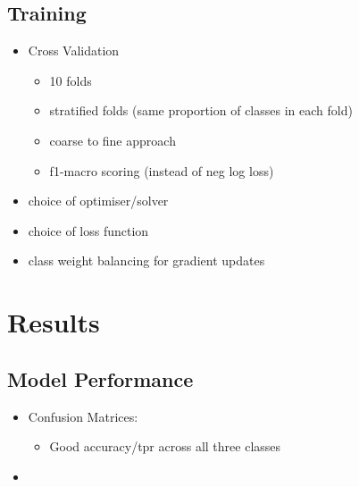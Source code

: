 \documentclass{article}
\begin{document}
\subsection{Training} \label{sec:training}
\begin{itemize}
    \item Cross Validation
          \begin{itemize}
              \item 10 folds
              \item stratified folds (same proportion of classes in each fold)
              \item coarse to fine approach
              \item f1-macro scoring (instead of neg log loss)
          \end{itemize}
    \item choice of optimiser/solver
    \item choice of loss function
    \item class weight balancing for gradient updates

\end{itemize}

\section{Results} \label{sec:results}

\subsection{Model Performance} \label{sec:cohort1-performance}

\begin{itemize}
    \item Confusion Matrices:
          \begin{itemize}
              \item Good accuracy/tpr across all three classes
          \end{itemize}
    \item
\end{itemize}
\end{document}
